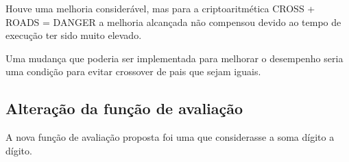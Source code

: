\documentclass[hidelinks,12pt]{article}
\begin{document}
	
	\justify
	Houve uma melhoria considerável, mas para a criptoaritmética CROSS + ROADS = DANGER a melhoria alcançada não compensou devido ao tempo de execução ter sido muito elevado.
	
	Uma mudança que poderia ser implementada para melhorar o desempenho seria uma condição para evitar crossover de pais que sejam iguais.
	
	
	\subsection{Alteração da função de avaliação}
	
	A nova função de avaliação proposta foi uma que considerasse a soma dígito a dígito.
\end{document}
